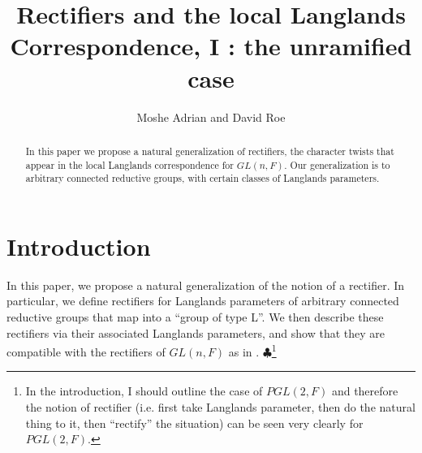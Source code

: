 \documentclass[11pt]{amsart}
\theoremstyle{plain}
\newcommand{\MAxxx}[1]{$\clubsuit$\footnote{#1}}
\theoremstyle{definition}
\begin{document}
\title{Rectifiers and the local Langlands Correspondence, I : the unramified case}
\author{Moshe Adrian and David Roe}



\begin{abstract}

In this paper we propose a natural generalization of rectifiers, the
character twists that appear in the local Langlands correspondence for
$GL(n,F)$.  Our generalization is to arbitrary connected reductive
groups, with certain classes of Langlands parameters.

\end{abstract}

\maketitle

\section{Introduction}
In this paper, we propose a natural generalization of the notion of a
rectifier.  In particular, we define rectifiers for Langlands
parameters of arbitrary connected reductive groups that map into a
``group of type L''.  We then describe these rectifiers via their
associated Langlands parameters, and show that they are compatible
with the rectifiers of $GL(n,F)$ as in \cite{bushnellhenniart}.
\MAxxx{In the introduction, I should outline the case of $PGL(2,F)$ 
and therefore the notion of rectifier (i.e. first take Langlands
parameter, then do the natural thing to it, then ``rectify''
the situation) can be seen very clearly for $PGL(2,F)$.}
\end{document}
